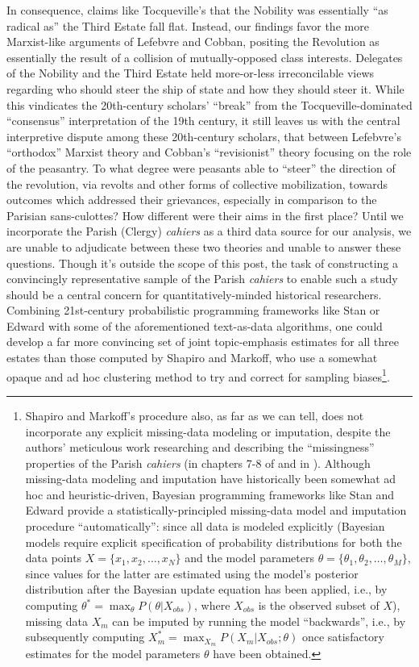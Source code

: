 In consequence, claims like Tocqueville's that the Nobility was essentially ``as radical as'' the Third Estate fall flat. Instead, our findings favor the more Marxist-like arguments of Lefebvre and Cobban, positing the Revolution as essentially the result of a collision of mutually-opposed class interests. Delegates of the Nobility and the Third Estate held more-or-less irreconcilable views regarding who should steer the ship of state and how they should steer it. While this vindicates the 20th-century scholars' ``break'' from the Tocqueville-dominated ``consensus'' interpretation of the 19th century, it still leaves us with the central interpretive dispute among these 20th-century scholars, that between Lefebvre's ``orthodox'' Marxist theory and Cobban's ``revisionist'' theory focusing on the role of the peasantry. To what degree were peasants able to ``steer'' the direction of the revolution, via revolts and other forms of collective mobilization, towards outcomes which addressed their grievances, especially in comparison to the Parisian sans-culottes? How different were their aims in the first place? Until we incorporate the Parish (Clergy) \textit{cahiers} as a third data source for our analysis, we are unable to adjudicate between these two theories and unable to answer these questions. Though it's outside the scope of this post, the task of constructing a convincingly representative sample of the Parish \textit{cahiers} to enable such a study should be a central concern for quantitatively-minded historical researchers. Combining  21st-century probabilistic programming frameworks like Stan or Edward with some of the aforementioned text-as-data algorithms, one could develop a far more convincing set of joint topic-emphasis estimates for all three estates than those computed by Shapiro and Markoff, who use a somewhat opaque and ad hoc clustering method to try and correct for sampling biases\footnote{Shapiro and Markoff's procedure also, as far as we can tell, does not incorporate any explicit missing-data modeling or imputation, despite the authors' meticulous work researching and describing the ``missingness'' properties of the Parish \textit{cahiers} (in chapters 7-8 of \cite{shapiro_revolutionary_1998} and in \cite{duncan_baretta_selective_1987}). Although missing-data modeling and imputation have historically been somewhat ad hoc and heuristic-driven, Bayesian programming frameworks like Stan and Edward provide a statistically-principled missing-data model and imputation procedure ``automatically'': since all data is modeled explicitly (Bayesian models require explicit specification of probability distributions for both the data points $X = \{x_1, x_2, \ldots, x_N\}$ and the model parameters $\theta = \{\theta_1, \theta_2, \ldots, \theta_M\}$, since values for the latter are estimated using the model's posterior distribution after the Bayesian update equation has been applied, i.e., by computing $\theta^* = \max_{\theta} P(\theta | X_{obs})$, where $X_{obs}$ is the observed subset of $X$), missing data $X_m$ can be imputed by running the model ``backwards'', i.e., by subsequently computing $X_m^* = \max_{X_m} P(X_m | X_{obs}; \theta)$ once satisfactory estimates for the model parameters $\theta$ have been obtained.}.

